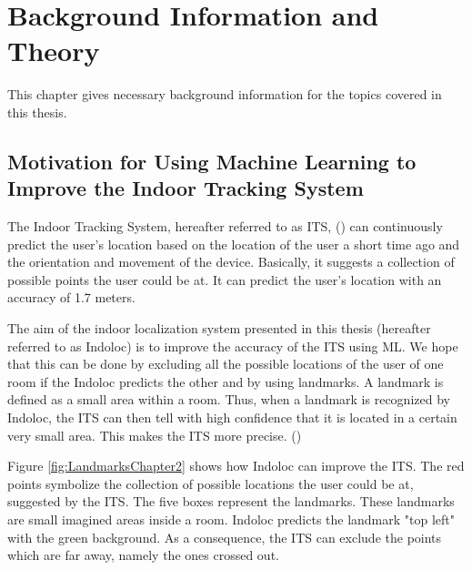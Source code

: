 
\chapter{Background Information and Theory} %
\label{Chapter2} %



This chapter gives necessary background information for the topics covered in this thesis. 

\section{Motivation for Using Machine Learning to Improve the Indoor Tracking System}

The Indoor Tracking System, hereafter referred to as ITS, (\cite{indoor_tracking_system_smartphones, tracking_system_fuse, fine_grained, sensor_fusion}) can continuously predict the user's location based on the location of the user a short time ago and the orientation and movement of the device. Basically, it suggests a collection of possible points the user could be at. It can predict the user's location with an accuracy of 1.7 meters.

The aim of the indoor localization system presented in this thesis (hereafter referred to as Indoloc) is to improve the accuracy of the ITS using ML. We hope that this can be done by excluding all the possible locations of the user of one room if the Indoloc predicts the other and by using landmarks. A landmark is defined as a small area within a room. Thus, when a landmark is recognized by Indoloc, the ITS can then tell with high confidence that it is located in a certain very small area. This makes the ITS more precise. (\cite{continuous_indoor_positioning, indoor_positioning_method})

Figure \ref{fig:LandmarksChapter2} shows how Indoloc can improve the ITS. The red points symbolize the collection of possible locations the user could be at, suggested by the ITS. The five boxes represent the landmarks. These landmarks are small imagined areas inside a room. Indoloc predicts the landmark "top left" with the green background. As a consequence, the ITS can exclude the points which are far away, namely the ones crossed out.


